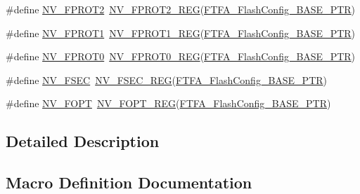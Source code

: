 \begin{DoxyCompactItemize}
\item 
\#define \hyperlink{group___n_v___register___accessor___macros_gaedf00f22b7dabfa124aeb38cdd5fb8a8}{N\+V\+\_\+\+F\+P\+R\+O\+T2}~\hyperlink{group___n_v___register___accessor___macros_gae06ab638a7b4ad4757c89118971127d0}{N\+V\+\_\+\+F\+P\+R\+O\+T2\+\_\+\+R\+EG}(\hyperlink{group___n_v___peripheral_ga3458652dfc38239f92682556e63596b5}{F\+T\+F\+A\+\_\+\+Flash\+Config\+\_\+\+B\+A\+S\+E\+\_\+\+P\+TR})
\item 
\#define \hyperlink{group___n_v___register___accessor___macros_ga35eb345943dea70476ecc9f1cc3db473}{N\+V\+\_\+\+F\+P\+R\+O\+T1}~\hyperlink{group___n_v___register___accessor___macros_ga1f9fafcb15ed5d1b27020f5b04edfe00}{N\+V\+\_\+\+F\+P\+R\+O\+T1\+\_\+\+R\+EG}(\hyperlink{group___n_v___peripheral_ga3458652dfc38239f92682556e63596b5}{F\+T\+F\+A\+\_\+\+Flash\+Config\+\_\+\+B\+A\+S\+E\+\_\+\+P\+TR})
\item 
\#define \hyperlink{group___n_v___register___accessor___macros_gabd1755172d62e3c49cb9e79d2065a147}{N\+V\+\_\+\+F\+P\+R\+O\+T0}~\hyperlink{group___n_v___register___accessor___macros_ga04dc6fb630cffc56b5fff1847704cc53}{N\+V\+\_\+\+F\+P\+R\+O\+T0\+\_\+\+R\+EG}(\hyperlink{group___n_v___peripheral_ga3458652dfc38239f92682556e63596b5}{F\+T\+F\+A\+\_\+\+Flash\+Config\+\_\+\+B\+A\+S\+E\+\_\+\+P\+TR})
\item 
\#define \hyperlink{group___n_v___register___accessor___macros_ga6bdca22aa1e76ebd389ecf4a5d70b93c}{N\+V\+\_\+\+F\+S\+EC}~\hyperlink{group___n_v___register___accessor___macros_gafcfd540f11abf7f4644b7c5a5bc272fe}{N\+V\+\_\+\+F\+S\+E\+C\+\_\+\+R\+EG}(\hyperlink{group___n_v___peripheral_ga3458652dfc38239f92682556e63596b5}{F\+T\+F\+A\+\_\+\+Flash\+Config\+\_\+\+B\+A\+S\+E\+\_\+\+P\+TR})
\item 
\#define \hyperlink{group___n_v___register___accessor___macros_gad508c386413905d31c12a2319fa355e3}{N\+V\+\_\+\+F\+O\+PT}~\hyperlink{group___n_v___register___accessor___macros_ga66cb061090c7bd7c8b2447b133a93ce5}{N\+V\+\_\+\+F\+O\+P\+T\+\_\+\+R\+EG}(\hyperlink{group___n_v___peripheral_ga3458652dfc38239f92682556e63596b5}{F\+T\+F\+A\+\_\+\+Flash\+Config\+\_\+\+B\+A\+S\+E\+\_\+\+P\+TR})
\end{DoxyCompactItemize}


\subsection{Detailed Description}


\subsection{Macro Definition Documentation}
